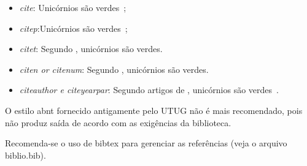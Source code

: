 \begin{itemize}
    \item \emph{cite}: Unicórnios são verdes~\cite{Aquino2012};
    \item \emph{citep}:Unicórnios são verdes~\citep{Aquino2012};
    \item \emph{citet}: Segundo \citet{Aquino2012}, unicórnios são
    verdes.
    \item \emph{citen or citenum}: Segundo ,
    unicórnios são verdes.
    \item \emph{citeauthor e citeyearpar}: Segundo artigos de
    \citeauthor{Aquino2012} , unicórnios são verdes~\citeyearpar{Aquino2012}.

\end{itemize}

O estilo abnt fornecido antigamente pelo UTUG não é mais recomendado, pois não
produz saída de acordo com as exigências da biblioteca.

Recomenda-se o uso de bibtex para gerenciar as referências (veja o arquivo
biblio.bib).
